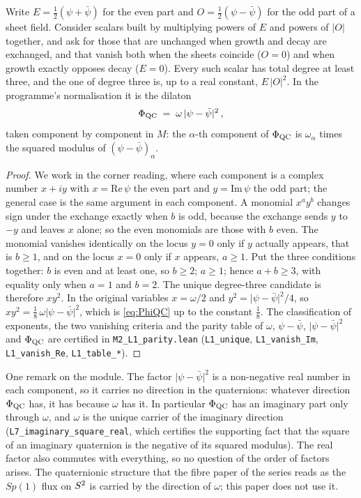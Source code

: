 \begin{proposition}\label{prop:parity}
Write $E=\tfrac12(\psi+\bar\psi)$ for the even part and $O=\tfrac12(\psi-\bar\psi)$
for the odd part of a sheet field. Consider scalars built by multiplying
powers of $E$ and powers of $\lvert O\rvert$ together, and ask for those
that are unchanged when growth and decay are exchanged, and that vanish
both when the sheets coincide ($O=0$) and when growth exactly opposes
decay ($E=0$). Every such scalar has total degree at least three, and the
one of degree three is, up to a real constant, $E\,\lvert O\rvert^{2}$.
In the programme's normalisation it is the dilaton
\begin{equation}\label{eq:PhiQC}
  \Phi_{\mathrm{QC}}\;=\;\omega\,\lvert\psi-\bar\psi\rvert^{2}\,,
\end{equation}
taken component by component in $M$: the $\alpha$-th component of $\Phi_{\mathrm{QC}}$
is $\omega_{\alpha}$ times the squared modulus of $(\psi-\bar\psi)_{\alpha}$.
\end{proposition}

\begin{proof}
We work in the corner reading, where each component is a complex number
$x+iy$ with $x=\mathrm{Re}\,\psi$ the even part and $y=\mathrm{Im}\,\psi$ the
odd part; the general case is the same argument in each component. A
monomial $x^{a}y^{b}$ changes sign under the exchange exactly when $b$ is
odd, because the exchange sends $y$ to $-y$ and leaves $x$ alone; so the
even monomials are those with $b$ even. The monomial vanishes identically
on the locus $y=0$ only if $y$ actually appears, that is $b\ge1$, and on the
locus $x=0$ only if $x$ appears, $a\ge1$. Put the three conditions together:
$b$ is even and at least one, so $b\ge2$; $a\ge1$; hence $a+b\ge3$, with
equality only when $a=1$ and $b=2$. The unique degree-three candidate is
therefore $xy^{2}$. In the original variables $x=\omega/2$ and
$y^{2}=\lvert\psi-\bar\psi\rvert^{2}/4$, so $xy^{2}=\tfrac18\,\omega\lvert\psi-\bar\psi\rvert^{2}$,
which is \eqref{eq:PhiQC} up to the constant $\tfrac18$. The classification
of exponents, the two vanishing criteria and the parity table of $\omega$,
$\psi-\bar\psi$, $\lvert\psi-\bar\psi\rvert^{2}$ and $\Phi_{\mathrm{QC}}$ are certified in
\texttt{M2\_L1\_parity.lean} (\texttt{L1\_unique}, \texttt{L1\_vanish\_Im},
\texttt{L1\_vanish\_Re}, \texttt{L1\_table\_*}). \rigR
\end{proof}

One remark on the module. The factor $\lvert\psi-\bar\psi\rvert^{2}$ is a
non-negative real number in each component, so it carries no direction in
the quaternions: whatever direction $\Phi_{\mathrm{QC}}$ has, it has because $\omega$ has
it. In particular $\Phi_{\mathrm{QC}}$ has an imaginary part only through $\omega$, and
$\omega$ is the unique carrier of the imaginary direction
(\texttt{L7\_imaginary\_square\_real}, which certifies the supporting fact
that the square of an imaginary quaternion is the negative of its squared
modulus). The real factor also commutes with everything, so no question of
the order of factors arises. The quaternionic structure that the fibre
paper of the series reads as the $Sp(1)$ flux on $S^2$ is carried by the
direction of $\omega$; this paper does not use it. \rigR

